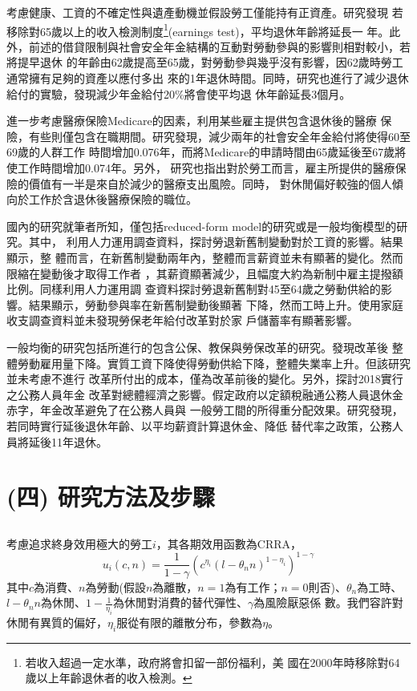\documentclass[12pt]{article}
\begin{document}
\begin{CJK*}{UTF8}{bkai}
\cite{french2005}考慮健康、工資的不確定性與遺產動機並假設勞工僅能持有正資產。研究發現
若移除對65歲以上的收入檢測制度\footnote{若收入超過一定水準，政府將會扣留一部份福利，美
國在2000年時移除對64歲以上年齡退休者的收入檢測。}(earnings test)，平均退休年齡將延長一
年。此外，前述的借貸限制與社會安全年金結構的互動對勞動參與的影響則相對較小，若將提早退休
的年齡由62歲提高至65歲，對勞動參與幾乎沒有影響，因62歲時勞工通常擁有足夠的資產以應付多出
來的1年退休時間。同時，研究也進行了減少退休給付的實驗，發現減少年金給付20\%將會使平均退
休年齡延長3個月。

\cite{french2011}進一步考慮醫療保險Medicare的因素，利用某些雇主提供包含退休後的醫療
保險，有些則僅包含在職期間。研究發現，減少兩年的社會安全年金給付將使得60至69歲的人群工作
時間增加0.076年，而將Medicare的申請時間由65歲延後至67歲將使工作時間增加0.074年。另外，
研究也指出對於勞工而言，雇主所提供的醫療保險的價值有一半是來自於減少的醫療支出風險。同時，
對休閒偏好較強的個人傾向於工作於含退休後醫療保險的職位。

國內的研究就筆者所知，僅包括reduced-form model的研究或是一般均衡模型的研究。其中，
\cite{yang2009}利用人力運用調查資料，探討勞退新舊制變動對於工資的影響。結果顯示，整
體而言，在新舊制變動兩年內，整體而言薪資並未有顯著的變化。然而限縮在變動後才取得工作者
，其薪資顯著減少，且幅度大約為新制中雇主提撥額比例。\cite{yang2010}同樣利用人力運用調
查資料探討勞退新舊制對45至64歲之勞動供給的影響。結果顯示，勞動參與率在新舊制變動後顯著
下降，然而工時上升。\cite{chen2015}使用家庭收支調查資料並未發現勞保老年給付改革對於家
戶儲蓄率有顯著影響。

一般均衡的研究包括\cite{reform2017}所進行的包含公保、教保與勞保改革的研究。發現改革後
整體勞動雇用量下降。實質工資下降使得勞動供給下降，整體失業率上升。但該研究並未考慮不進行
改革所付出的成本，僅為改革前後的變化。另外，\cite{jhang2020}探討2018實行之公務人員年金
改革對總體經濟之影響。假定政府以定額稅融通公務人員退休金赤字，年金改革避免了在公務人員與
一般勞工間的所得重分配效果。研究發現，若同時實行延後退休年齡、以平均薪資計算退休金、降低
替代率之政策，公務人員將延後11年退休。

\section*{\normalfont(四) 研究方法及步驟}

\subsection*{}
考慮追求終身效用極大的勞工$i$，其各期效用函數為CRRA，
\begin{equation}
    u_i(c,n) = \frac{1}{1-\gamma}(c^{\eta_i} (l-\theta_n n)^{1-\eta_i})^{1-\gamma}
\end{equation}
其中$c$為消費、$n$為勞動(假設$n$為離散，$n=1$為有工作；$n=0$則否)、$\theta_n$為工時、
$l-\theta_n n$為休閒、$1-\frac{1}{\eta_i}$為休閒對消費的替代彈性、$\gamma$為風險厭惡係
數。我們容許對休閒有異質的偏好，$\eta_i$服從有限的離散分布，參數為$\eta$。


\end{CJK*}
\end{document}
